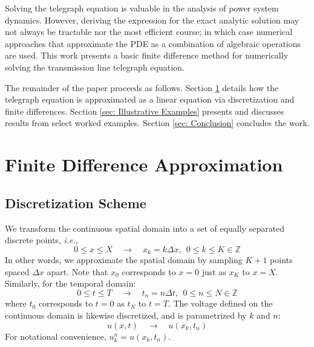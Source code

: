 \documentclass{article}
\begin{document}
Solving the telegraph equation is valuable in the analysis of power system dynamics.
However, deriving the expression for the exact analytic solution may not always be tractable nor the most efficient course;
in which case numerical approaches that approximate the PDE as a combination of algebraic operations are used.
This work presents a basic finite difference method for numerically solving the transmission line telegraph equation.

The remainder of the paper proceeds as follows.
Section \ref{sec: Finite Difference Approximation} details how the telegraph equation is approximated as a linear equation via discretization and finite differences.
Section \ref{sec: Illustrative Examples} presents and discusses results from select worked examples.
Section \ref{sec: Conclusion} concludes the work.

\section{Finite Difference Approximation}
\label{sec: Finite Difference Approximation}

\subsection{Discretization Scheme}
\label{subsec: Discretization Scheme}

We transform the continuous spatial domain into a set of equally separated discrete points, \textit{i.e.},
\begin{equation*}
   0 \leq x \leq X \quad
   \longrightarrow \quad
   x_{k} = k \Delta x,\ \ 0 \leq k \leq K \in \mathbb{Z}
\end{equation*}
In other words, we approximate the spatial domain by sampling $K+1$ points spaced $\Delta x$ apart.
Note that $x_{0}$ corresponds to $x=0$ just as $x_{K}$ to $x=X$.
Similarly, for the temporal domain:
\begin{equation*}
   0 \leq t \leq T \quad
   \longrightarrow \quad
   t_{n} = n \Delta t,\ \ 0 \leq n \leq N \in \mathbb{Z}
\end{equation*}
where $t_0$ corresponds to $t=0$ as $t_{N}$ to $t=T$.
The voltage defined on the continuous domain is likewise discretized,
and is parametrized by $k$ and $n$:
\begin{equation*}
   u \left(x,t\right) \quad
   \longrightarrow \quad
   u \left(x_{k},t_{n}\right)
\end{equation*}
For notational convenience, $u_{k}^{n} = u \left(x_{k},t_{n}\right)$.
\end{document}
